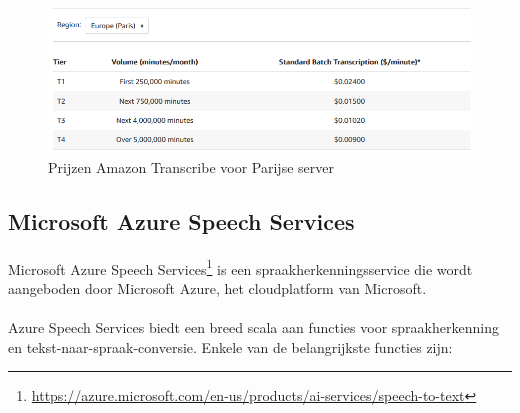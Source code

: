 \begin{figure}[h]
    \centering
    \includegraphics[width=\linewidth*3/4]{graphics/AmazonTranscribePricing.png}
    \caption{Prijzen Amazon Transcribe voor Parijse server \autocite{Amazon2023}}
    \label{fig:PricingAmazonTranscribe}
\end{figure}

\subsection{Microsoft Azure Speech Services}%

\paragraph{}
Microsoft Azure Speech Services\footnote{\href{https://azure.microsoft.com/en-us/products/ai-services/speech-to-text}{https://azure.microsoft.com/en-us/products/ai-services/speech-to-text}} is een spraakherkenningsservice die wordt aangeboden door Microsoft Azure, het cloudplatform van Microsoft.

\paragraph{}
Azure Speech Services biedt een breed scala aan functies voor spraakherkenning en tekst-naar-spraak-conversie. Enkele van de belangrijkste functies zijn:

